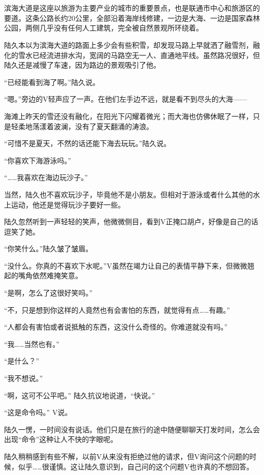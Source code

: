 \section*{}

滨海大道是这座以旅游为主要产业的城市的重要景点，也是联通市中心和旅游区的要道。这条公路长约20公里，全部沿着海岸线修建，一边是大海、一边是国家森林公园，两侧几乎没有任何人工建筑，完全被自然景观所环绕着。

陆久本以为滨海大道的路面上多少会有些积雪，却发现马路上早就洒了融雪剂，融化的雪水已经流进排水沟，宽阔的马路空无一人、直通地平线。虽然路况很好，但陆久还是减慢了车速，因为路边的景观吸引了他。

“已经能看到海了啊。”陆久说。

“嗯。”旁边的V轻声应了一声。在他们左手边不远，就是看不到尽头的大海——

海滩上昨天的雪还没有融化，在阳光下闪耀着微光；而大海也仿佛休眠了一样，只是轻柔地荡漾着波澜，没有了夏天翻涌的涛浪。

“可惜不是夏天，不然的话还能下海去玩玩。”陆久说。

“你喜欢下海游泳吗。”

“……我喜欢在海边玩沙子。”

当然，陆久也不喜欢玩沙子，毕竟他不是小朋友。但相对于游泳或者什么其他的水上运动，他还是觉得玩沙子要好一些。

陆久忽然听到一声轻轻的笑声，他微微侧目，看到V正掩口胡卢，好像是自己的话逗笑了她。

“你笑什么。”陆久皱了皱眉。

“没什么。你真的不喜欢下水呢。”V虽然在竭力让自己的表情平静下来，但微微翘起的嘴角依然难掩笑意。

“是啊，怎么了这很好笑吗。”

“不，只是想到你这样的人竟然也有会害怕的东西，就觉得有点……有趣。”

“人都会有害怕或者说抵触的东西，这没什么奇怪的。你难道就没有吗。”

“我……当然也有。”

“是什么？”

“我不想说。”

“啊，这可不公平吧。” 陆久抗议地说道，“快说。”

“这是命令吗。” V说。

陆久一愣，一时间没有说话。他们只是在旅行的途中随便聊聊天打发时间，怎么会出现“命令”这种让人不快的字眼呢。

陆久稍稍感到有些不解，以前V从来没有拒绝过他的请求，但V询问这个问题的时候，似乎……很谨慎。这让陆久意识到，自己问的这个问题V也许真的不想回答。

